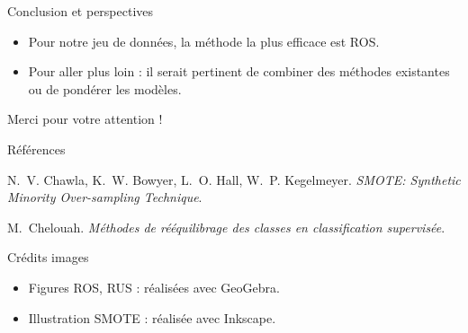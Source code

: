 \documentclass{beamer}
\begin{document}
\begin{frame}{Conclusion et perspectives}
    \begin{itemize}
        \item Pour notre jeu de données, la méthode la plus efficace est ROS.\\[0.5cm]
        \item  Pour aller plus loin : il serait pertinent de combiner des méthodes existantes ou de pondérer les modèles.
    \end{itemize}
\end{frame}

\begin{frame}
    \centering
    \Huge Merci pour votre attention !
\end{frame}

\begin{frame}[allowframebreaks]{Références}
    \small
    \begin{thebibliography}{9}

    N.~V. Chawla, K.~W. Bowyer, L.~O. Hall, W.~P. Kegelmeyer.
    \newblock \emph{SMOTE: Synthetic Minority Over-sampling Technique}.

    M.~Chelouah.
    \newblock \emph{Méthodes de rééquilibrage des classes en classification supervisée}.

    \end{thebibliography}
    \end{frame}

    \begin{frame}{Crédits images}
      \small
      \begin{itemize}
        \item Figures ROS, RUS : réalisées avec GeoGebra.
        \item Illustration SMOTE : réalisée avec Inkscape.
      \end{itemize}
    \end{frame}
\end{document}
